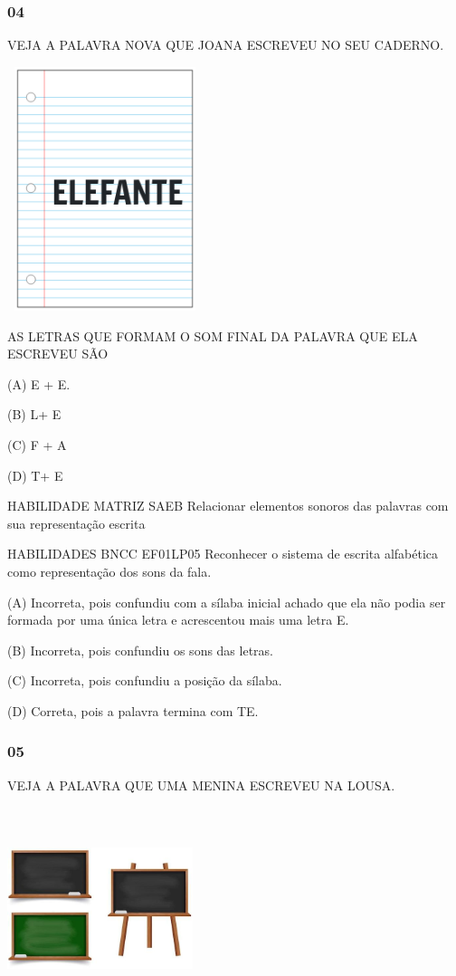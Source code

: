 \begin{escola}
{{{{{{{{{{{{{{{{{{\subsubsection{04}\label{section-60}

VEJA A PALAVRA NOVA QUE JOANA ESCREVEU NO SEU CADERNO.

\includegraphics[width=2.24931in,height=2.80435in]{media/image230.png}

AS LETRAS QUE FORMAM O SOM FINAL DA PALAVRA QUE ELA ESCREVEU SÃO

(A) E + E.

(B) L+ E

(C) F + A

(D) T+ E

HABILIDADE MATRIZ SAEB Relacionar elementos sonoros das palavras com sua
representação escrita

HABILIDADES BNCC EF01LP05 Reconhecer o sistema de escrita alfabética
como representação dos sons da fala.

(A) Incorreta, pois confundiu com a sílaba inicial achado que ela não
podia ser formada por uma única letra e acrescentou mais uma letra E.

(B) Incorreta, pois confundiu os sons das letras.

(C) Incorreta, pois confundiu a posição da sílaba.

(D) Correta, pois a palavra termina com TE.

\subsubsection{05}\label{section-61}

VEJA A PALAVRA QUE UMA MENINA ESCREVEU NA LOUSA.

\includegraphics[width=2.13044in,height=2.33234in]{media/image231.jpg}

}}}}}}}}}}}}}}}}}}
\end{escola}
